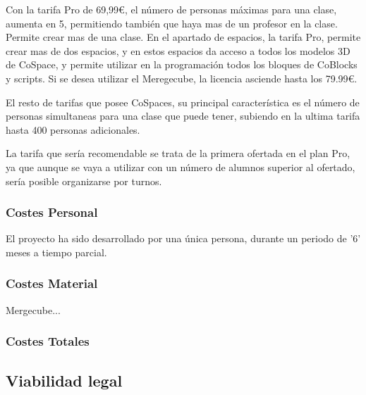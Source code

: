 Con la tarifa Pro de 69,99\euro{}, el número de personas máximas para una clase, aumenta en 5, permitiendo también que haya mas de un profesor en la clase. Permite crear mas de una clase. En el apartado de espacios, la tarifa Pro, permite crear mas de dos espacios, y en estos espacios da acceso a todos los modelos 3D de CoSpace, y permite utilizar en la programación todos los bloques de CoBlocks y scripts.
Si se desea utilizar el Meregecube, la licencia asciende hasta los 79.99\euro{}. 

El resto de tarifas que posee CoSpaces, su principal característica es el número de personas simultaneas para una clase que puede tener, subiendo en la ultima tarifa hasta 400 personas adicionales.

La tarifa que sería recomendable se trata de la primera ofertada en el plan Pro, ya que aunque se vaya a utilizar con un número de alumnos superior al ofertado, sería posible organizarse por turnos.

\subsubsection{Costes Personal}
El proyecto ha sido desarrollado por una única persona, durante un periodo de '6' meses a tiempo parcial.

\subsubsection{Costes Material}
Mergecube...
\subsubsection{Costes Totales}
\subsection{Viabilidad legal}


